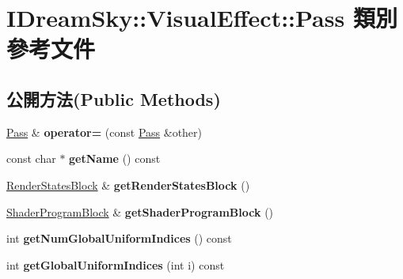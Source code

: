 \hypertarget{class_i_dream_sky_1_1_visual_effect_1_1_pass}{}\section{I\+Dream\+Sky\+:\+:Visual\+Effect\+:\+:Pass 類別 參考文件}
\label{class_i_dream_sky_1_1_visual_effect_1_1_pass}
\subsection*{公開方法(Public Methods)}
\begin{DoxyCompactItemize}
\item 
\hyperlink{class_i_dream_sky_1_1_visual_effect_1_1_pass}{Pass} \& {\bfseries operator=} (const \hyperlink{class_i_dream_sky_1_1_visual_effect_1_1_pass}{Pass} \&other)\hypertarget{class_i_dream_sky_1_1_visual_effect_1_1_pass_aa7a8f71a3d10a4293604270791738cc6}{}\label{class_i_dream_sky_1_1_visual_effect_1_1_pass_aa7a8f71a3d10a4293604270791738cc6}

\item 
const char $\ast$ {\bfseries get\+Name} () const \hypertarget{class_i_dream_sky_1_1_visual_effect_1_1_pass_afa3a5238b16d10c23ccf2a0f8c77d9f0}{}\label{class_i_dream_sky_1_1_visual_effect_1_1_pass_afa3a5238b16d10c23ccf2a0f8c77d9f0}

\item 
\hyperlink{class_i_dream_sky_1_1_render_states_block}{Render\+States\+Block} \& {\bfseries get\+Render\+States\+Block} ()\hypertarget{class_i_dream_sky_1_1_visual_effect_1_1_pass_a9ae58c21336609bc1a6900caa3ab2a2d}{}\label{class_i_dream_sky_1_1_visual_effect_1_1_pass_a9ae58c21336609bc1a6900caa3ab2a2d}

\item 
\hyperlink{class_i_dream_sky_1_1_shader_program_block}{Shader\+Program\+Block} \& {\bfseries get\+Shader\+Program\+Block} ()\hypertarget{class_i_dream_sky_1_1_visual_effect_1_1_pass_a9d51dde6ce54941595f01f33350599f1}{}\label{class_i_dream_sky_1_1_visual_effect_1_1_pass_a9d51dde6ce54941595f01f33350599f1}

\item 
int {\bfseries get\+Num\+Global\+Uniform\+Indices} () const \hypertarget{class_i_dream_sky_1_1_visual_effect_1_1_pass_a881cc00bd043ca2f233e7a8bb28f3a9f}{}\label{class_i_dream_sky_1_1_visual_effect_1_1_pass_a881cc00bd043ca2f233e7a8bb28f3a9f}

\item 
int {\bfseries get\+Global\+Uniform\+Indices} (int i) const \hypertarget{class_i_dream_sky_1_1_visual_effect_1_1_pass_a8d4b1b833f1ccaa207d847e506b5bdf3}{}\label{class_i_dream_sky_1_1_visual_effect_1_1_pass_a8d4b1b833f1ccaa207d847e506b5bdf3}


\end{DoxyCompactItemize}
